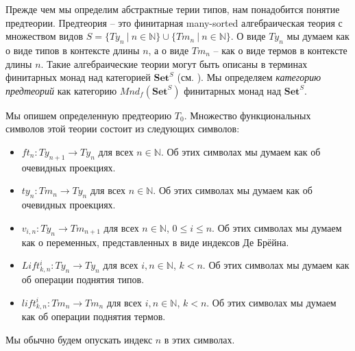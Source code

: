 \documentclass{amsart}
\theoremstyle{definition}
\theoremstyle{remark}
\newcommand{\cat}[1]{\mathbf{#1}}
\newcommand{\Set}{\cat{Set}}
\numberwithin{figure}{section}
\begin{document}
Прежде чем мы определим абстрактные терии типов, нам понадобится понятие предтеории.
Предтеория -- это финитарная many-sorted алгебраическая теория с множеством видов $S = \{ Ty_n\ |\ n \in \mathbb{N} \} \cup \{ Tm_n\ |\ n \in \mathbb{N} \}$.
О виде $Ty_n$ мы думаем как о виде типов в контексте длины $n$, а о виде $Tm_n$ -- как о виде термов в контексте длины $n$.
Такие алгебраические теории могут быть описаны в терминах финитарных монад над категорией $\Set^S$ (см. \cite{LPC}).
Мы определяем \emph{категорию предтеорий} как категорию $Mnd_f(\Set^S)$ финитарных монад над $\Set^S$.

Мы опишем определенную предтеорию $T_0$.
Множество функциональных символов этой теории состоит из следующих символов:
\begin{itemize}
\item $ft_n : Ty_{n+1} \to Ty_n$ для всех $n \in \mathbb{N}$. Об этих символах мы думаем как об очевидных проекциях.
\item $ty_n : Tm_n \to Ty_n$ для всех $n \in \mathbb{N}$. Об этих символах мы думаем как об очевидных проекциях.
\item $v_{i,n} : Ty_n \to Tm_{n+1}$ для всех $n \in \mathbb{N}$, $0 \leq i \leq n$. Об этих символах мы думаем как о переменных, представленных в виде индексов Де Брёйна.
\item $Lift^i_{k,n} : Ty_n \to Ty_n$ для всех $i, n \in \mathbb{N}$, $k < n$. Об этих символах мы думаем как об операции поднятия типов.
\item $lift^i_{k,n} : Tm_n \to Tm_n$ для всех $i, n \in \mathbb{N}$, $k < n$. Об этих символах мы думаем как об операции поднятия термов.
\end{itemize}
Мы обычно будем опускать индекс $n$ в этих символах.
\end{document}
